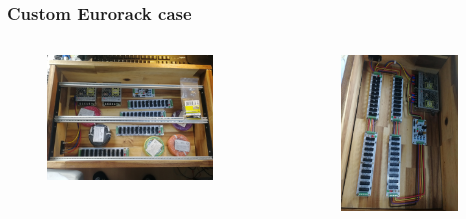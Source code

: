 \begin{frame}
\begin{columns}
\begin{column}{0.5\textwidth}
\begin{figure}[H]
	\end{figure}
\end{column}
\end{columns}
\end{frame}

\begin{frame}
\frametitle{Custom Eurorack case}
\begin{columns}
\begin{column}{0.65\textwidth}
	\begin{figure}[H]
		\centering
		\includegraphics[width=0.86\textwidth]{eurorack3.jpg}
	\end{figure}
\end{column}
\begin{column}{0.35\textwidth}
	\begin{figure}[H]
		\centering
		\includegraphics[width=0.9\textwidth]{eurorack4.jpg}

\end{figure}
\end{column}
\end{columns}
\end{frame}
